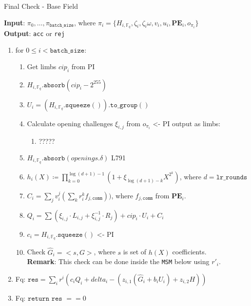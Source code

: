 \begin{algorithm}[H]
    \caption{Final Check - Base Field}
    \textbf{Input}: $\pi_0, \dots, \pi_{\texttt{batch\_size}}$, where $\pi_i = \{H_{i, \mathbb{F}_q}, \zeta_i, \zeta_i\omega, v_i, u_i,
    \textbf{PE}_i, o_{\pi_i} \}$ \\
    \textbf{Output}: \texttt{acc} or \texttt{rej}
    \begin{enumerate}
        \item for $0 \leq i < \texttt{batch\_size}$:
        \begin{enumerate}
        	\item Get limbs $cip_i$ from PI
            \item $H_{i, \mathbb{F}_q}.\texttt{absorb}(cip_i - 2^{255})$
            \item $U_i = (H_{i, \mathbb{F}_q}.\texttt{squeeze}()).\texttt{to\_group}()$
            \item Calculate opening challenges $\xi_{i, j}$ from $o_{\pi_i}$ <- PI output as limbs:
            \begin{enumerate}
            	\item ?????
            \end{enumerate}
            \item $H_{i, \mathbb{F}_q}.\texttt{absorb}(openings.\delta)$ L791
            \item $h_i(X) \coloneqq \prod_{k=0}^{\log(d+1) - 1}(1 + \xi_{\log(d+1)-k}X^{2^k})$, where $d = \texttt{lr\_rounds}$
            \item $C_i = \sum\limits_{j}v_i^j(\sum\limits_{k}r_i^k f_{j, \texttt{comm}}))$, where $f_{j, \texttt{comm}}$ from $\textbf{PE}_i$.
            \item $Q_i = \sum (\xi_{i, j} \cdot L_{i, j} + \xi_{i, j}^{-1} \cdot R_j) + cip_i \cdot U_i + C_i$
            \item $c_i = H_{i, \mathbb{F}_q}.\texttt{squeeze}()$ <- PI
            \item Check $\hat{G}_i = <s, G>$, where $s$ is set of $h(X)$ coefficients. \\
            \textbf{Remark}: This check can be done inside the \texttt{MSM} below using $r'_i$.
        \end{enumerate}
        \item Fq: $\texttt{res} = \sum\limits_i r^i (c_i Q_i + delta_i - ( z_{i, 1} (\hat{G}_i + b_i U_i) + z_{i, 2} H ))$
        \item Fq: $\texttt{return res } == 0$
    \end{enumerate}
\end{algorithm}

